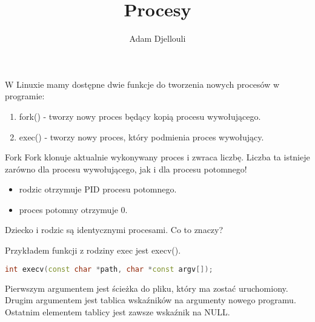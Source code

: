 \documentclass[notheorems, aspectratio=54]{beamer}
\title[Procesy]{Procesy}
\author{Adam Djellouli}
\begin{document}
\begin{frame}
    \titlepage
\end{frame}

\begin{frame}

W Linuxie mamy dostępne dwie funkcje do tworzenia nowych procesów w programie:

\begin{enumerate}
\item fork() - tworzy nowy proces będący kopią procesu wywołującego. 
\item exec() - tworzy nowy proces, który podmienia proces wywołujący.
\end{enumerate}

\end{frame}

\begin{frame}
Fork
Fork klonuje aktualnie wykonywany proces i zwraca liczbę. 
Liczba ta istnieje zarówno dla procesu wywołującego, jak i dla procesu potomnego!

\begin{itemize}
\item rodzic otrzymuje PID procesu potomnego.
\item proces potomny otrzymuje 0.
\end{itemize}

Dziecko i rodzic są identycznymi procesami. Co to znaczy?


Przykładem funkcji z rodziny exec jest execv().

\begin{lstlisting}[language=C++]
int execv(const char *path, char *const argv[]);
\end{lstlisting}

Pierwszym argumentem jest ścieżka do pliku, który ma zostać uruchomiony. 
Drugim argumentem jest tablica wskaźników na argumenty nowego programu.
Ostatnim elementem tablicy jest zawsze wskaźnik na NULL.
\end{frame}
\end{document}

